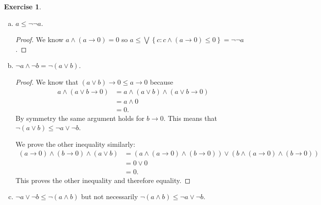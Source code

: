 \documentclass{article}
\newcommand{\set}[1]{\left\{#1\right\}}
\newcommand{\setwith}[2]{\set{#1:#2}}
\theoremstyle{definition}
\newtheorem{question}{Exercise}
\begin{document}
\begin{question}
\begin{enumerate}[(a)]
        \item \(a\leq\neg\neg a\).

              \begin{proof}
                  We know \(a\wedge(a\to 0)=0\) so
                  \(a\leq\bigvee\setwith{c}{c\wedge(a\to 0)\leq0}=\neg\neg a\).
              \end{proof}

        \item \(\neg a\wedge\neg b=\neg(a\vee b)\).

              \begin{proof}
                  We know that \((a\vee b)\to 0\leq a\to 0\) because
                  \begin{align*}
                      a\wedge(a\vee b\to 0) & =a\wedge (a\vee b)\wedge(a\vee b\to 0) \\
                                            & =a\wedge 0                             \\
                                            & =0.
                  \end{align*}
                  By symmetry the same argument holds for \(b\to 0\). This means
                  that \(\neg(a\vee b)\leq\neg a\vee\neg b\).

                  We prove the other inequality similarly:
                  \begin{align*}
                      (a\to 0)\wedge(b\to 0)\wedge(a\vee b) & =(a\wedge(a\to 0)\wedge(b\to 0))\vee(b\wedge(a\to 0)\wedge(b\to0)) \\
                                                            & =0\vee0                                                            \\
                                                            & =0.
                  \end{align*}
                  This proves the other inequality and therefore equality.
              \end{proof}

        \item \(\neg a\vee\neg b\leq\neg(a\wedge b)\) but not necessarily
              \(\neg(a\wedge b)\leq\neg a\vee\neg b\).


\end{enumerate}
\end{question}
\end{document}
